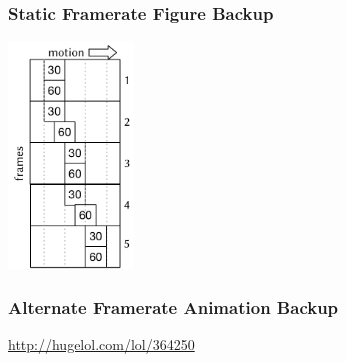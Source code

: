 \documentclass{UDEbeamerEN}
\begin{document}
\begin{frame}
	\frametitle{Static Framerate Figure Backup}

	\begin{center}
		\includegraphics[width=0.25\textwidth]{../../../models/framerate-poster.pdf}
	\end{center}
\end{frame}

\begin{frame}
	\frametitle{Alternate Framerate Animation Backup}

	\begin{center}
		\vspace{2mm}
		{\tiny\url{http://hugelol.com/lol/364250}}
	\end{center}
\end{frame}

\setcounter{framenumber}{\value{finalframe}}
\end{document}
